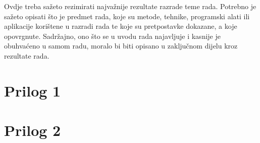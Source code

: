 \documentclass{foi}
\begin{document}
Ovdje treba sažeto rezimirati najvažnije rezultate razrade teme rada. Potrebno je sažeto opisati što je predmet rada, koje su metode, tehnike, programski alati ili aplikacije korištene u razradi rada te koje su pretpostavke dokazane, a koje opovrgnute. Sadržajno, ono što se u uvodu rada najavljuje i kasnije je obuhvaćeno u samom radu, moralo bi biti opisano u zaključnom dijelu kroz rezultate rada. 

\lipsum[1-2]

\printbibliography[title=Popis literature]

\listoffigures
{}
 
\listoftables
{}

\appendix
\renewcommand{\thechapter}{\arabic{chapter}}

\chapter{Prilog 1}

\chapter{Prilog 2}
\end{document}
